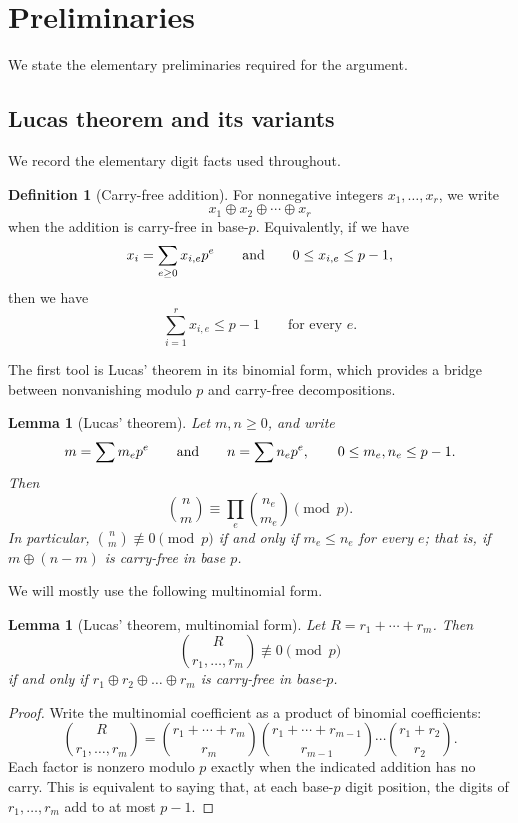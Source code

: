 \documentclass[11pt]{amsart}
\newtheorem{lemma}[theorem]{Lemma}
\theoremstyle{definition}
\newtheorem*{definition}{Definition}
\begin{document}
\section{Preliminaries}\label{sec:prelim}
We state the elementary preliminaries required for the argument.

\subsection{Lucas theorem and its variants}
We record the elementary digit facts used throughout.

\begin{definition}[Carry-free addition]\label{def:carryfree}
For nonnegative integers $x_1,\ldots,x_r$, we write
\[
  x_1\oplus x_2\oplus\cdots\oplus x_r
\]
when the addition is carry-free in base-$p$.  Equivalently, if we have
\[
  x_i=\sum_{e\geq 0}x_{i,e}p^e
  \qquad {\text {\rm and}}\qquad 0\leq x_{i,e}\leq p-1,
\]
then we have
\[
  \sum_{i=1}^r x_{i,e}\leq p-1
  \qquad\text{for every }e.
\]
\end{definition}

The first tool is Lucas' theorem in its binomial form,
which provides a bridge between nonvanishing modulo $p$ and carry-free decompositions.

\begin{lemma}[Lucas' theorem]\label{lem:Lucas-binomial}
Let $m,n\geq 0$, and write
\[
  m=\sum m_ep^e\qquad {\text {\rm and}}\qquad n=\sum n_ep^e,
  \qquad 0\leq m_e,n_e\leq p-1.
\]
Then
\[
  \binom{n}{m}\equiv\prod_e\binom{n_e}{m_e}\pmod p.
\]
In particular, $\binom{n}{m}\not\equiv 0\pmod p$ if and only if $m_e\leq n_e$ for every $e$;
that is, if $m \oplus (n-m)$ is carry-free in base $p$.
\end{lemma}

We will mostly use the following multinomial form.

\begin{lemma}[Lucas' theorem, multinomial form]\label{lem:mult-Lucas}
Let $R=r_1+\cdots+r_m$.  Then
\[
  \binom{R}{r_1,\ldots,r_m}\not\equiv 0\pmod p
\]
if and only if $r_1 \oplus r_2 \oplus \dots \oplus r_m$ is carry-free in base-$p$.
\end{lemma}

\begin{proof}
Write the multinomial coefficient as a product of binomial coefficients:
\[
  \binom{R}{r_1,\ldots,r_m}
  =\binom{r_1+\cdots+r_m}{r_m}
   \binom{r_1+\cdots+r_{m-1}}{r_{m-1}}\cdots
   \binom{r_1+r_2}{r_2}.
\]
Each factor is nonzero modulo $p$ exactly when the indicated addition has no carry.
This is equivalent to saying that, at each base-$p$ digit position,
the digits of $r_1,\ldots,r_m$ add to at most $p-1$.
\end{proof}
\end{document}

